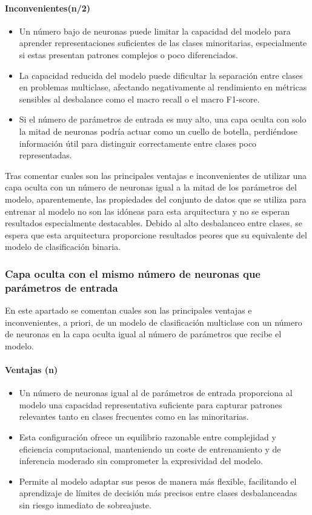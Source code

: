 \paragraph{Inconvenientes(n/2)}
\begin{itemize}
	\item Un número bajo de neuronas puede limitar la capacidad del modelo para aprender representaciones suficientes de las clases minoritarias, especialmente si estas presentan patrones complejos o poco diferenciados.
	\item La capacidad reducida del modelo puede dificultar la separación entre clases en problemas multiclase, afectando negativamente al rendimiento en métricas sensibles al desbalance como el macro recall o el macro F1-score.
	\item Si el número de parámetros de entrada es muy alto, una capa oculta con solo la mitad de neuronas podría actuar como un cuello de botella, perdiéndose información útil para distinguir correctamente entre clases poco representadas.

\end{itemize}

Tras comentar cuales son las principales ventajas e inconvenientes de utilizar una capa oculta con un número de neuronas igual a la mitad de los parámetros del modelo, aparentemente, las propiedades del conjunto de datos que se utiliza para entrenar al modelo no son las idóneas para esta arquitectura y no se esperan resultados especialmente destacables. Debido al alto desbalanceo entre clases, se espera que esta arquitectura proporcione resultados peores que su equivalente del modelo de clasificación binaria.

\subsubsection{Capa oculta con el mismo número de neuronas que parámetros de entrada}\label{sec:VIMUL49}
En este apartado se comentan cuales son las principales ventajas e inconvenientes, a priori, de un modelo de clasificación multiclase con un número de neuronas en la capa oculta igual al número de parámetros que recibe el modelo.

\paragraph{Ventajas (n)}
\begin{itemize}
	\item Un número de neuronas igual al de parámetros de entrada proporciona al modelo una capacidad representativa suficiente para capturar patrones relevantes tanto en clases frecuentes como en las minoritarias.
	\item Esta configuración ofrece un equilibrio razonable entre complejidad y eficiencia computacional, manteniendo un coste de entrenamiento y de inferencia moderado sin comprometer la expresividad del modelo.
	\item Permite al modelo adaptar sus pesos de manera más flexible, facilitando el aprendizaje de límites de decisión más precisos entre clases desbalanceadas sin riesgo inmediato de sobreajuste.

\end{itemize}
